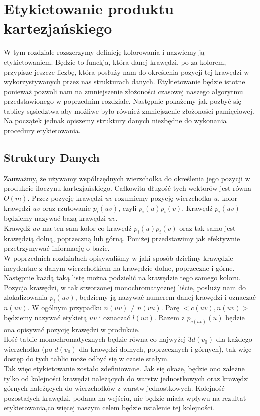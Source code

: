 \documentclass[12pt,a4paper,titlepage]{article}
\begin{document}
\section{Etykietowanie produktu kartezjańskiego}
W tym rozdziale rozszerzymy definicję kolorowania i nazwiemy ją etykietowaniem. Będzie to funckja, która danej krawędzi, po za kolorem, przypisze jeszcze liczbę, która posłuży nam do określenia pozycji tej krawędzi w wykorzystywanych przez nas strukturach danych. Etykietowanie będzie istotne ponieważ pozwoli nam na zmniejszenie złożoności czasowej naszego algorytmu przedstawionego w poprzednim rozdziale. Następnie pokażemy jak pozbyć się tablicy sąsiedztwa aby możliwe było również zmniejszenie złożoności pamięciowej. Na początek jednak opiszemy struktury danych niezbędne do wykonania procedury etykietowania.
\subsection{Struktury Danych}
Zauważmy, że używamy współrzędnych wierzchołka do określenia jego pozycji w produkcie iloczynu kartezjańskiego. Całkowita długość tych wektorów jest równa $O(m)$. Przez pozycję krawędzi $uv$ rozumiemy pozycję wierzchołka $u$, kolor krawędzi $uv$ oraz rzutowanie $p_i (uv)$, czyli $p_i(u) p_i(v)$. Krawędź $p_i (uv)$ będziemy nazywać bazą krawędzi $uv$. \\
Krawędź $uv$ ma ten sam kolor co krawędź $p_i (u)p_i(v)$ oraz tak samo jest krawędzią dolną, poprzeczną lub górną. Poniżej przedstawimy jak efektywnie przetrzymywać informację o bazie. \\
W poprzednich rozdziałach opisywaliśmy w jaki sposób dzielimy krawędzie incydentne z danym wierzchołkiem na krawędzie dolne, poprzeczne i górne. Następnie każdą taką listę można podzielić na krawędzie tego samego koloru. Pozycja krawędzi, w tak stworzonej monochromatycznej liście, posłuży nam do zlokalizowania $p_i(uv)$, będziemy ją nazywać numerem danej krawędzi i oznaczać $n(uv)$. W ogólnym przypadku $n(uv) \neq n(vu)$. Parę $<c(uv), n(uv)>$ będziemy nazywać etykietą $uv$ i oznaczać $l(uv)$. Razem z $p_{c(uv)}(u)$ będzie ona opisywać pozycję krawędzi w produkcie. \\
Ilość tablic monochromatycznych będzie równa co najwyżej $3d(v_0 )$ dla każdego wierzchołka (po $d(v_0)$ dla krawędzi dolnych, poprzecznych i górnych), tak więc dostęp do tych tablic może odbyć się w czasie stałym.\\
Tak więc etykietowanie zostało zdefiniowane. Jak się okaże, będzie ono zależne tylko od kolejności krawędzi należących do warstw jednostkowych oraz krawędzi górnych należących do wierzchołków z warstw jednostkowych. Kolejność pozostałych krawędzi, podana na wejściu, nie będzie miała wpływu na rezultat etykietowania,co więcej naszym celem będzie ustalenie tej kolejności. \\
\end{document}
